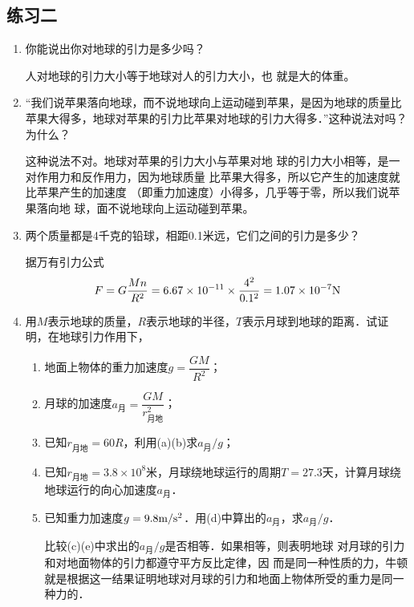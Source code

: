 \subsection{练习二}
\begin{enumerate}
	\item 你能说出你对地球的引力是多少吗？

	\begin{solution}
		人对地球的引力大小等于地球对人的引力大小，也
		就是大的体重。
	\end{solution}
	
\item “我们说苹果落向地球，而不说地球向上运动碰到苹果，是因为地球的质量比苹果大得多，地球对苹果的引力比苹果对地球的引力大得多．”这种说法对吗？为什么？

\begin{solution}
	这种说法不对。地球对苹果的引力大小与苹果对地
	球的引力大小相等，是一对作用力和反作用力，因为地球质量
	比苹果大得多，所以它产生的加速度就比苹果产生的加速度
	（即重力加速度）小得多，几乎等于零，所以我们说苹果落向地
	球，面不说地球向上运动碰到苹果。
\end{solution}

\item 两个质量都是4千克的铅球，相距0.1米远，它们之间的引力是多少？

\begin{solution}
	据万有引力公式
\[F=G\frac{Mn}{R^2}=6.67\times 10^{-11}\times \frac{4^2}{0.1^2}=1.07\times 10^{-7}{\rm N}\]
\end{solution}

\item 用$M$表示地球的质量，$R$表示地球的半径，$T$表示月球到地球的距离．试证明，在地球引力作用下，
\begin{enumerate}
	\item 地面上物体的重力加速度$g=\dfrac{GM}{R^2}$；
	\item 月球的加速度$a_{\text{月}}=\dfrac{GM}{r^2_{\text{月地}}}$；
	\item 已知$r_{\text{月地}}=60R$，利用(a)(b)求$a_{\text{月}}/g$；
	\item 已知$r_{\text{月地}}=3.8\times 10^8$米，月球绕地球运行的周期$T=27.3$天，计算月球绕地球运行的向心加速度$a_{\text{月}}$．
	\item 已知重力加速度$g=9.8\text{m}/\text{s}^2$．用(d)中算出的$a_{\text{月}}$，求$a_{\text{月}}/g$．
	
	比较(c)(e)中求出的$a_{\text{月}}/g$是否相等．如果相等，则表明地球
	对月球的引力和对地面物体的引力都遵守平方反比定律，因
	而是同一种性质的力，牛顿就是根据这一结果证明地球对月球的引力和地面上物体所受的重力是同一种力的．
\end{enumerate}


\end{enumerate}
